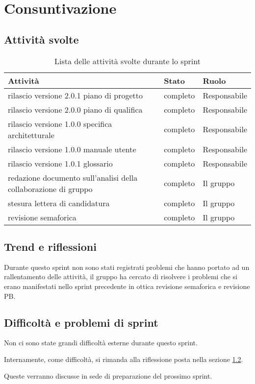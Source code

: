 \section{Consuntivazione}

\subsection{Attività svolte}

\begin{table}[H]
    \begin{xltabular}{\textwidth}{X l l}

         \textbf{Attività} & \textbf{Stato} & \textbf{Ruolo}\\
        \endhead
        \hline
        rilascio versione 2.0.1 piano di progetto & completo & Responsabile \\
        rilascio versione 2.0.0 piano di qualifica & completo & Responsabile \\
        rilascio versione 1.0.0 specifica architetturale & completo & Responsabile \\
        rilascio versione 1.0.0 manuale utente & completo & Responsabile \\
        rilascio versione 1.0.1 glossario & completo & Responsabile \\
        redazione documento sull'analisi della collaborazione di gruppo & completo & Il gruppo \\
        stesura lettera di candidatura & completo & Il gruppo \\
        revisione semaforica & completo & Il gruppo \\
    \end{xltabular}
    \caption{Lista delle attività svolte durante lo sprint}
\end{table}

\subsection{Trend e riflessioni}\label{subsec:trend}

Durante questo sprint non sono stati registrati problemi che hanno portato ad un rallentamento delle attività, il gruppo ha cercato di risolvere i problemi che si erano manifestati nello sprint precedente in ottica revisione semaforica e revisione PB.

\subsection{Difficoltà e problemi di sprint}

Non ci sono state grandi difficoltà esterne durante questo sprint.

Internamente, come difficoltà, si rimanda alla riflessione posta nella sezione \ref{subsec:trend}.

Queste verranno discusse in sede di preparazione del prossimo sprint.